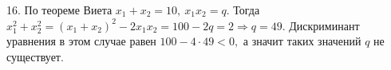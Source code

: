 16. По теореме Виета $x_1+x_2=10,\ x_1x_2=q.$ Тогда $x_1^2+x_2^2=(x_1+x_2)^2-2x_1x_2=100-2q=2\Rightarrow q=49.$ Дискриминант уравнения в этом случае равен $100-4\cdot49<0,$ а значит таких значений $q$ не существует.\\
